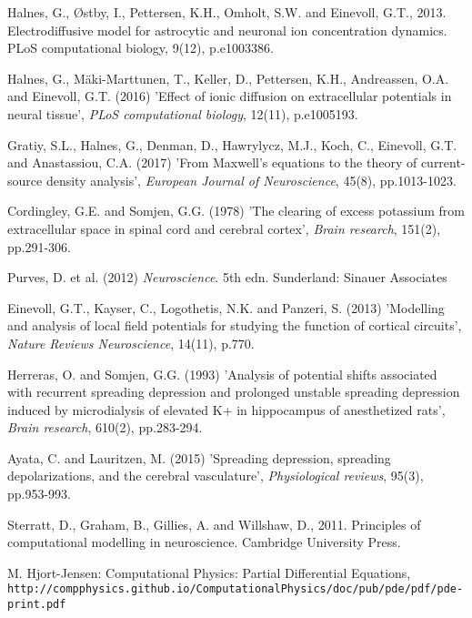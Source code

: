 \documentclass{article}
\begin{document}
\begin{thebibliography}{1}

Halnes, G., Østby, I., Pettersen, K.H., Omholt, S.W. and Einevoll, G.T., 2013. Electrodiffusive model for astrocytic and neuronal ion concentration dynamics. PLoS computational biology, 9(12), p.e1003386.

Halnes, G., Mäki-Marttunen, T., Keller, D., Pettersen, K.H., Andreassen, O.A. and Einevoll, G.T. (2016) 'Effect of ionic diffusion on extracellular potentials in neural tissue', \textit{PLoS computational biology}, 12(11), p.e1005193.

Gratiy, S.L., Halnes, G., Denman, D., Hawrylycz, M.J., Koch, C., Einevoll, G.T. and Anastassiou, C.A. (2017) 'From Maxwell's equations to the theory of current-source density analysis', \textit{European Journal of Neuroscience}, 45(8), pp.1013-1023.

Cordingley, G.E. and Somjen, G.G. (1978) 'The clearing of excess potassium from extracellular space in spinal cord and cerebral cortex', \textit{Brain research}, 151(2), pp.291-306.

Purves, D. et al. (2012) \textit{Neuroscience}. 5th edn.
Sunderland: Sinauer Associates

Einevoll, G.T., Kayser, C., Logothetis, N.K. and Panzeri, S. (2013) 'Modelling and analysis of local field potentials for studying the function of cortical circuits', \textit{Nature Reviews Neuroscience}, 14(11), p.770.

Herreras, O. and Somjen, G.G. (1993) 'Analysis of potential shifts associated with recurrent spreading depression and prolonged unstable spreading depression induced by microdialysis of elevated K+ in hippocampus of anesthetized rats', \textit{Brain research}, 610(2), pp.283-294.

Ayata, C. and Lauritzen, M. (2015) 'Spreading depression, spreading depolarizations, and the cerebral vasculature', \textit{Physiological reviews}, 95(3), pp.953-993.






Sterratt, D., Graham, B., Gillies, A. and Willshaw, D., 2011. Principles of computational modelling in neuroscience. Cambridge University Press.

M. Hjort-Jensen: Computational Physics: Partial Differential Equations,
\\\texttt{http://compphysics.github.io/ComputationalPhysics/doc/pub/pde/pdf/pde-print.pdf}








\end{thebibliography}
\end{document}
